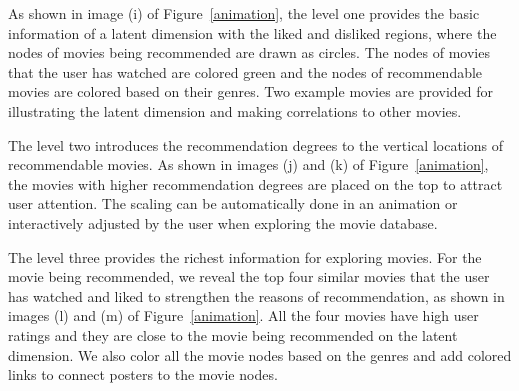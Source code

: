 \documentclass{vgtc}                          %
\begin{document}
As shown in image (i) of Figure~\ref{animation}, the level one provides the basic information of a latent dimension with the liked and disliked regions, where the nodes of movies being recommended are drawn as circles.
The nodes of movies that the user has watched are colored green and the nodes of recommendable movies are colored based on their genres.
Two example movies are provided for illustrating the latent dimension and making correlations to other movies.


The level two introduces the recommendation degrees to the vertical locations of recommendable movies. As shown in images (j) and (k) of Figure~\ref{animation}, the movies with higher recommendation degrees are placed on the top to attract user attention. 
The scaling can be automatically done in an animation or interactively adjusted by the user when exploring the movie database.


The level three provides the richest information for exploring movies.
For the movie being recommended, we reveal the top four similar movies that the user has watched and liked to strengthen the reasons of recommendation, as shown in images (l) and (m)  of Figure~\ref{animation}.
All the four movies have high user ratings and they are close to the movie being recommended on the latent dimension.
We also color all the movie nodes based on the genres and add colored links to connect posters to the movie nodes.


\end{document}
